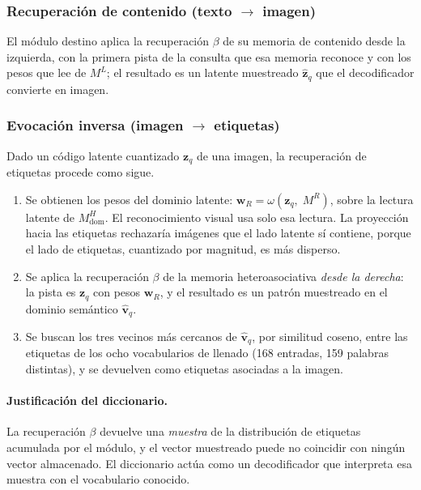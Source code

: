 \subsubsection*{Recuperación de contenido (texto $\to$ imagen)}

El módulo destino aplica la recuperación $\beta$ de su memoria de contenido desde la
izquierda, con la primera pista de la consulta que esa memoria reconoce y con los pesos
que lee de $M^L$; el resultado es un latente muestreado $\hat{\mathbf{z}}_q$ que el
decodificador convierte en imagen.

\subsubsection*{Evocación inversa (imagen $\to$ etiquetas)}

Dado un código latente cuantizado $\mathbf{z}_q$ de una imagen, la recuperación
de etiquetas procede como sigue.

\begin{enumerate}
    \item Se obtienen los pesos del dominio latente:
    $\mathbf{w}_R = \omega(\mathbf{z}_q,\; M^R)$, sobre la lectura latente de
    $M^H_{\mathrm{dom}}$.
    El reconocimiento visual usa solo esa lectura.
    La proyección hacia las etiquetas rechazaría imágenes que el lado latente sí
    contiene, porque el lado de etiquetas, cuantizado por magnitud, es más disperso.

    \item Se aplica la recuperación $\beta$ de la memoria heteroasociativa \emph{desde la
    derecha}: la pista es $\mathbf{z}_q$ con pesos $\mathbf{w}_R$, y el resultado es un
    patrón muestreado en el dominio semántico $\hat{\mathbf{v}}_q$.

    \item Se buscan los tres vecinos más cercanos de $\hat{\mathbf{v}}_q$, por similitud
    coseno, entre las etiquetas de los ocho vocabularios de llenado (168 entradas, 159
    palabras distintas), y se devuelven como etiquetas asociadas a la imagen.
\end{enumerate}

\paragraph{Justificación del diccionario.}
La recuperación $\beta$ devuelve una \emph{muestra} de la distribución de etiquetas acumulada
por el módulo, y el vector muestreado puede no coincidir con ningún vector almacenado.
El diccionario actúa como un decodificador que interpreta esa muestra con el
vocabulario conocido.

